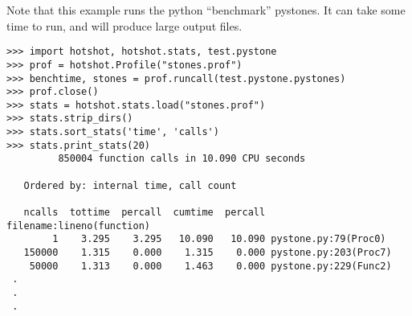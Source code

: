 Note that this example runs the python ``benchmark'' pystones.  It can
take some time to run, and will produce large output files.

\begin{verbatim}
>>> import hotshot, hotshot.stats, test.pystone
>>> prof = hotshot.Profile("stones.prof")
>>> benchtime, stones = prof.runcall(test.pystone.pystones)
>>> prof.close()
>>> stats = hotshot.stats.load("stones.prof")
>>> stats.strip_dirs()
>>> stats.sort_stats('time', 'calls')
>>> stats.print_stats(20)
         850004 function calls in 10.090 CPU seconds

   Ordered by: internal time, call count

   ncalls  tottime  percall  cumtime  percall filename:lineno(function)
        1    3.295    3.295   10.090   10.090 pystone.py:79(Proc0)
   150000    1.315    0.000    1.315    0.000 pystone.py:203(Proc7)
    50000    1.313    0.000    1.463    0.000 pystone.py:229(Func2)
 .
 .
 .
\end{verbatim}
